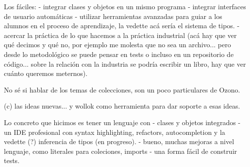 Los fáciles:
- integrar clases y objetos en un mismo programa
- integrar interfaces de usuario automáticas
- utilizar herramientas avanzadas para guiar a los alumnos en el proceso de aprendizaje, la vedette acá sería el sistema de tipos.
- acercar la práctica de lo que hacemos a la práctica industrial (acá hay que ver qué decimos y qué no, por ejemplo me molesta que no sea un archivo... pero desde lo metodológico se puede pensar en tests o incluso en un repositorio de código... sobre la relación con la industria se podría escribir un libro, hay que ver cuánto queremos meternos).

No sé si hablar de los temas de colecciones, son un poco particulares de Ozono.


\medskip 

(c) las ideas nuevas... y wollok como herramienta para dar soporte a esas ideas.

Lo concreto que hicimos es tener un lenguaje con
- clases y objetos integrados
- un IDE profesional con syntax highlighting, refactors, autocompletion y la vedette (?) inferencia de tipos (en progreso).
- bueno, muchas mejoras a nivel lenguaje, como literales para coleciones, imports
- una forma fácil de construir tests.

\medskip 



